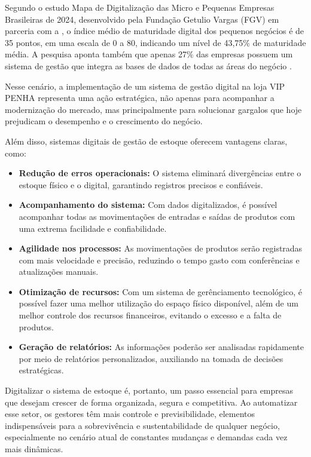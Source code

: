 \documentclass[
	12pt,				%
	openany,			%
	twoside,			%
	a4paper,			%
	english,			%
	brazil				%
	]{abntex2}
\begin{document}
Segundo o estudo Mapa de Digitalização das Micro e Pequenas Empresas Brasileiras de 2024, desenvolvido pela Fundação Getulio Vargas (FGV) em parceria com a  , o índice médio de maturidade digital dos pequenos negócios é de 35 pontos, em uma escala de 0 a 80, indicando um nível de 43,75\% de maturidade média. A pesquisa aponta também que apenas 27\% das empresas possuem um sistema de gestão que integra as bases de dados de todas as áreas do negócio . 

Nesse cenário, a implementação de um sistema de gestão digital na loja VIP PENHA representa uma ação estratégica, não apenas para acompanhar a modernização do mercado, mas principalmente para solucionar gargalos que hoje prejudicam o desempenho e o crescimento do negócio.

Além disso, sistemas digitais de gestão de estoque oferecem vantagens claras, como:

\begin{itemize}
    \item \textbf{Redução de erros operacionais:} O sistema eliminará divergências entre o estoque físico e o digital, garantindo registros precisos e confiáveis.
    \item \textbf{Acompanhamento do sistema:} Com dados digitalizados, é possível acompanhar todas as movimentações de entradas e saídas de produtos com uma extrema facilidade e confiabilidade.
    \item \textbf{Agilidade nos processos:} As movimentações de produtos serão registradas com mais velocidade e precisão, reduzindo o tempo gasto com conferências e atualizações manuais.
    \item \textbf{Otimização de recursos:} Com um sistema de gerênciamento tecnológico, é possível fazer uma melhor utilização do espaço físico disponível, além de um melhor controle dos recursos financeiros, evitando o excesso e a falta de produtos.
    \item \textbf{Geração de relatórios:} As informações poderão ser analisadas rapidamente por meio de relatórios personalizados, auxiliando na tomada de decisões estratégicas.
\end{itemize}

Digitalizar o sistema de estoque é, portanto, um passo essencial para empresas que desejam crescer de forma organizada, segura e competitiva. Ao automatizar esse setor, os gestores têm mais controle e previsibilidade, elementos indispensáveis para a sobrevivência e sustentabilidade de qualquer negócio, especialmente no cenário atual de constantes mudanças e demandas cada vez mais dinâmicas.
\end{document}
